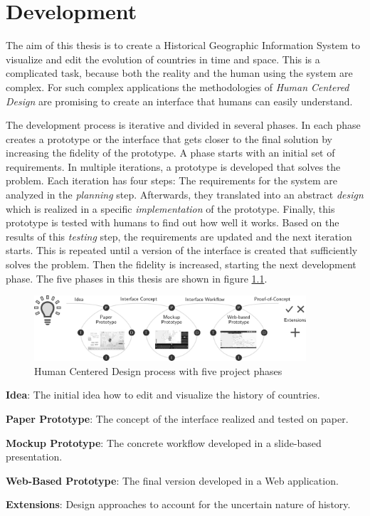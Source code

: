 
\chapter{Development} %
\label{cha:development}

The aim of this thesis is to create a Historical Geographic Information System to visualize and edit the evolution of countries in time and space. This is a complicated task, because both the reality and the human using the system are complex. For such complex applications the methodologies of \emph{Human Centered Design} are promising to create an interface that humans can easily understand.

The development process is iterative and divided in several phases. In each phase creates a prototype or the interface that gets closer to the final solution by increasing the fidelity of the prototype. A phase starts with an initial set of requirements. In multiple iterations, a prototype is developed that solves the problem. Each iteration has four steps: The requirements for the system are analyzed in the \emph{planning} step. Afterwards, they translated into an abstract \emph{design} which is realized in a specific \emph{implementation} of the prototype. Finally, this prototype is tested with humans to find out how well it works. Based on the results of this \emph{testing} step, the requirements are updated and the next iteration starts. This is repeated until a version of the interface is created that sufficiently solves the problem. Then the fidelity is increased, starting the next development phase. The five phases in this thesis are shown in figure \ref{fig:hcd}.

\begin{figure}[H]
  \vspace{1em}
  \centering
  \includegraphics[width=0.9\textwidth]{graphics/development/hcd}
  \caption{Human Centered Design process with five project phases}
  \label{fig:hcd}
\end{figure}

\newpage
\begin{compactenum}
  \item \textbf{Idea}: The initial idea how to edit and visualize the history of countries.
  \item \textbf{Paper Prototype}: The concept of the interface realized and tested on paper.
  \item \textbf{Mockup Prototype}: The concrete workflow developed in a slide-based presentation.
  \item \textbf{Web-Based Prototype}: The final version developed in a Web application.
  \item \textbf{Extensions}: Design approaches to account for the uncertain nature of history.
\end{compactenum}

